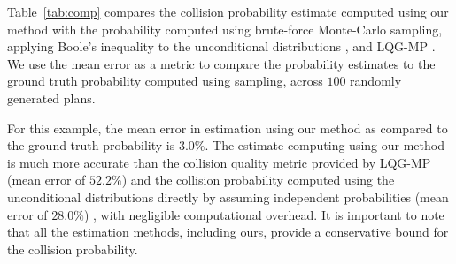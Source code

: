 Table~\ref{tab:comp} compares the collision probability estimate computed using our method with the probability computed using brute-force Monte-Carlo sampling, applying Boole's inequality to the unconditional distributions \cite{Vitus11_ICRA}, and LQG-MP \cite{vandenBerg11_IJRR}. We use the mean error as a metric to compare the probability estimates to the ground truth probability computed using sampling, across $100$ randomly generated plans.

For this example, the mean error in estimation using our method as compared to the ground truth probability is $3.0\%$. The estimate computing using our method is much more accurate than the collision quality metric provided by LQG-MP (mean error of $52.2\%$) \cite{vandenBerg11_IJRR} and the collision probability computed using the unconditional distributions directly by assuming independent probabilities (mean error of $28.0\%$) \cite{Vitus11_ICRA}, with negligible computational overhead. It is important to note that all the estimation methods, including ours, provide a conservative bound for the collision probability.

\setlength{\tabcolsep}{1.5pt}
\begin{table}[htb]
\centering
        \caption{Comparison of our method with existing approaches over $100$ randomly generated plans in terms of mean error from ground truth probability estimated by sampling.}
        \label{tab:comp}
\vspace{-15pt}
\end{table}

